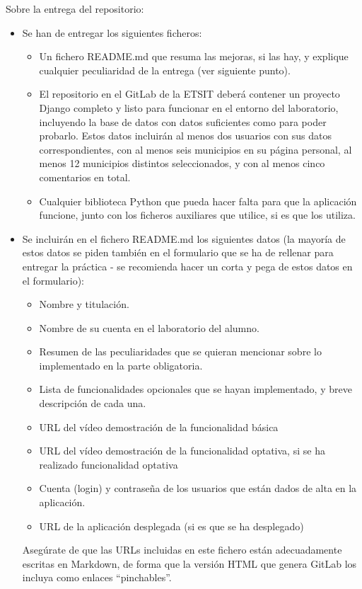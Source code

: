 Sobre la entrega del repositorio:
\begin{itemize}
  \item Se han de entregar los siguientes ficheros:

\begin{itemize}
  \item Un fichero README.md que resuma las mejoras, si las hay, y explique cualquier peculiaridad de la entrega (ver siguiente punto).
  \item El repositorio en el GitLab de la ETSIT deberá contener un proyecto Django completo y listo para funcionar en el entorno del laboratorio, incluyendo la base de datos con datos suficientes como para poder probarlo. Estos datos incluirán al menos dos usuarios con sus datos correspondientes, con al menos seis municipios en su página personal, al menos 12 municipios distintos seleccionados, y con al menos cinco comentarios en total.
  \item Cualquier biblioteca Python que pueda hacer falta para que la aplicación funcione, junto con los ficheros auxiliares que utilice, si es que los utiliza.
\end{itemize}

  \item Se incluirán en el fichero README.md los siguientes datos (la mayoría de estos datos se piden también en el formulario que se ha de rellenar para entregar la práctica - se recomienda hacer un corta y pega de estos datos en el formulario):

\begin{itemize}
  \item Nombre y titulación.
  \item Nombre de su cuenta en el laboratorio del alumno.
  \item Resumen de las peculiaridades que se quieran mencionar sobre lo implementado en la parte obligatoria.
  \item Lista de funcionalidades opcionales que se hayan implementado, y breve descripción de cada una.
  \item URL del vídeo demostración de la funcionalidad básica
  \item URL del vídeo demostración de la funcionalidad optativa, si se ha realizado funcionalidad optativa
  \item Cuenta (login) y contraseña de los usuarios que están dados de alta en la aplicación.
  \item URL de la aplicación desplegada (si es que se ha desplegado)
\end{itemize}

Asegúrate de que las URLs incluidas en este fichero están adecuadamente escritas en Markdown, de forma que la versión HTML que genera GitLab los incluya como enlaces ``pinchables''.
\end{itemize}


